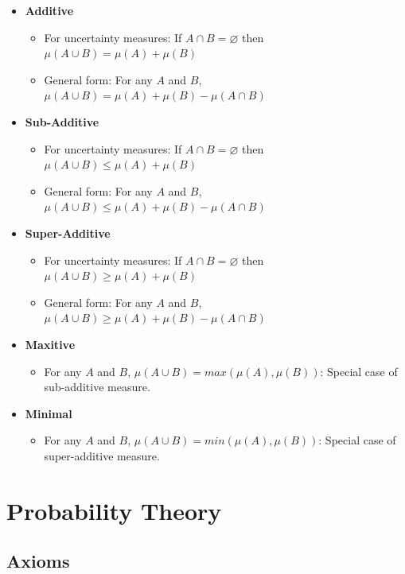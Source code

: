 \documentclass{article}
\begin{document}
\begin{itemize}
    \item \textbf{Additive}
\begin{itemize}
    \item For uncertainty measures: If $A \cap B = \varnothing$ then $\mu( A \cup B) = \mu(A) + \mu(B)$
    \item General form: For any $A$ and $B$, $\mu( A \cup B) = \mu(A) + \mu(B) - \mu(A \cap B)$
\end{itemize}
    \item \textbf{Sub-Additive}
\begin{itemize}
    \item For uncertainty measures: If $A \cap B = \varnothing$ then $\mu( A \cup B) \leq \mu(A) + \mu(B)$
    \item General form: For any $A$ and $B$, $\mu( A \cup B) \leq \mu(A) + \mu(B) - \mu(A \cap B)$
\end{itemize}
    \item \textbf{Super-Additive}
\begin{itemize}
    \item For uncertainty measures: If $A \cap B = \varnothing$ then $\mu( A \cup B) \geq \mu(A) + \mu(B)$
    \item General form: For any $A$ and $B$, $\mu( A \cup B) \geq \mu(A) + \mu(B) - \mu(A \cap B)$
\end{itemize}
    \item \textbf{Maxitive}
\begin{itemize}
    \item For any $A$ and $B$, $\mu( A \cup B) = max(\mu(A), \mu(B))$: Special case of sub-additive measure.
\end{itemize}
    \item \textbf{Minimal}
\begin{itemize}
    \item For any $A$ and $B$, $\mu( A \cup B) = min(\mu(A), \mu(B))$: Special case of super-additive measure.
\end{itemize}
\end{itemize}



\section{Probability Theory}

\subsection{Axioms}
\end{document}
